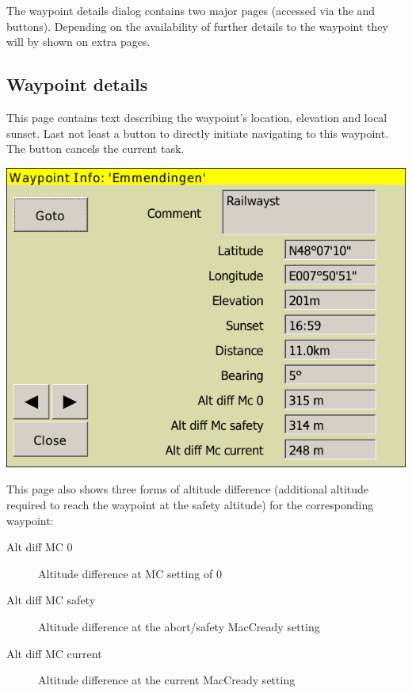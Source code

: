 \documentclass[a4paper,12pt]{refrep}
\begin{document}
The waypoint details dialog contains two major pages (accessed via the
\button{$>$} and \button{$<$} buttons). Depending on the availability of further
details to the waypoint they will by shown on extra pages.

\subsection*{Waypoint details}
This page contains text describing the waypoint's location, elevation
and local sunset. Last not least a button  to directly initiate
navigating to this waypoint. The button cancels the current task. 
\begin{center}
\includegraphics[angle=0,width=0.8\linewidth,keepaspectratio='true']{figures/dialog-waypointdetails0.png}
\end{center}

This page also shows three forms of altitude difference (additional
altitude required to reach the waypoint at the safety altitude) for
the corresponding waypoint:
\begin{description}
\item[Alt diff MC 0] Altitude difference at MC setting of 0
\item[Alt diff MC safety] Altitude difference at the abort/safety MacCready setting
\item[Alt diff MC current] Altitude difference at the current MacCready setting
\end{description}
\end{document}
